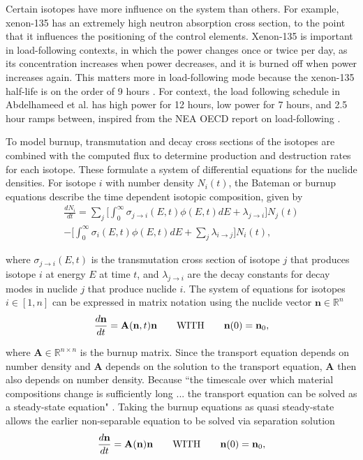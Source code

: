 \documentclass[letterpaper]{physor2024}
\begin{document}
Certain isotopes have more influence on the system than others. For example, xenon-135 has an extremely high neutron absorption cross section, to the point that it influences the positioning of the control elements. Xenon-135 is important in load-following contexts, in which the power changes once or twice per day, as its concentration increases when power decreases, and it is burned off when power increases again. This matters more in load-following mode because the xenon-135 half-life is on the order of 9 hours \cite{d-and-h}. For context, the load following schedule in Abdelhameed et al. has high power for 12 hours, low power for 7 hours, and 2.5 hour ramps between, inspired from the NEA OECD report on load-following \cite{Abdelhameed-ANS-2022,nea-oecd-LF}.

To model burnup, transmutation and decay cross sections of the isotopes are combined with the computed flux to determine production and destruction rates for each isotope. These formulate a system of differential equations for the nuclide densities. For isotope $i$ with number density $N_{i}(t)$, the Bateman or burnup equations describe the time dependent isotopic composition, given by
\vspace*{-0.1cm}
\begin{multline} \label{eq:batemen}
    \frac{dN_{i}}{dt} =
    \sum_{j} \bigg[\int_{0}^{\infty} \sigma_{j\rightarrow{i}}(E,t)\phi(E,t)dE + \lambda_{j\rightarrow{i}}\bigg]N_{j}(t) \\
    -\bigg[\int_{0}^{\infty} \sigma_{i}(E,t)\phi(E,t)dE
    +\sum_{j}\lambda_{i\rightarrow{j}}\bigg] N_{i}(t),
\end{multline}

\noindent where $\sigma_{j\rightarrow{i}}(E,t)$ is the transmutation cross section of isotope $j$ that produces isotope $i$ at energy $E$ at time $t$, and $\lambda_{j\rightarrow{i}}$ are the decay constants for decay modes in nuclide $j$ that produce nuclide $i$. The system of equations for isotopes $i\in[1,n]$ can be expressed in matrix notation using the nuclide vector $\mathbf{n}\in\mathbb{R}^{n}$
\begin{equation} \label{eq:burnup matrix odes}
    \frac{d\textbf{n}}{dt} =
    \textbf{A}(\textbf{n},t) \textbf{n}
    \qquad \text{WITH} \qquad
    \textbf{n}(0) = \textbf{n}_{0},
\end{equation}

\noindent where $\textbf{A}\in\mathbb{R}^{n\times n}$ is the burnup matrix. Since the transport equation depends on number density and $\textbf{A}$ depends on the solution to the transport equation, $\textbf{A}$ then also depends on number density. Because ``the timescale over which material compositions change is sufficiently long ... the transport equation can be solved as a steady-state equation" \cite{romano-depletion-2021}. Taking the burnup equations as quasi steady-state allows the earlier non-separable equation to be solved via separation solution
\begin{equation} \label{eq:separable burnup matrix odes}
    \frac{d\textbf{n}}{dt} =
    \textbf{A}(\textbf{n}) \textbf{n}
    \qquad \text{WITH} \qquad
    \textbf{n}(0) = \textbf{n}_{0},
\end{equation}
\end{document}
